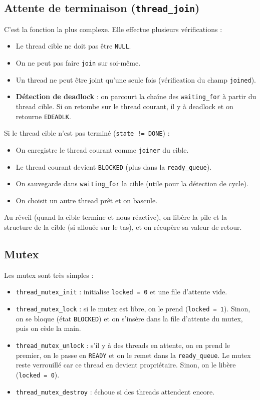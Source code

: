 \documentclass[12pt,a4paper]{article}
\begin{document}
\subsection{Attente de terminaison (\texttt{thread\_join})}

C’est la fonction la plus complexe. Elle effectue plusieurs vérifications :

\begin{itemize}
    \item Le thread cible ne doit pas être \texttt{NULL}.
    \item On ne peut pas faire \texttt{join} sur soi-même.
    \item Un thread ne peut être joint qu’une seule fois (vérification du champ \texttt{joined}).
    \item \textbf{Détection de deadlock} : on parcourt la chaîne des \texttt{waiting\_for} à partir du thread cible. Si on retombe sur le thread courant, il y à deadlock et on retourne \texttt{EDEADLK}.
\end{itemize}

Si le thread cible n’est pas terminé (\texttt{state != DONE}) :

\begin{itemize}
    \item On enregistre le thread courant comme \texttt{joiner} du cible.
    \item Le thread courant devient \texttt{BLOCKED} (plus dans la \texttt{ready\_queue}).
    \item On sauvegarde dans \texttt{waiting\_for} la cible (utile pour la détection de cycle).
    \item On choisit un autre thread prêt et on bascule.
\end{itemize}

Au réveil (quand la cible termine et nous réactive), on libère la pile et la structure de la cible (si allouée sur le tas), et on récupère sa valeur de retour.

\subsection{Mutex}

Les mutex sont très simples :

\begin{itemize}
    \item \texttt{thread\_mutex\_init} : initialise \texttt{locked = 0} et une file d’attente vide.
    \item \texttt{thread\_mutex\_lock} : si le mutex est libre, on le prend (\texttt{locked = 1}). Sinon, on se bloque (état \texttt{BLOCKED}) et on s’insère dans la file d’attente du mutex, puis on cède la main.
    \item \texttt{thread\_mutex\_unlock} : s’il y à des threads en attente, on en prend le premier, on le passe en \texttt{READY} et on le remet dans la \texttt{ready\_queue}. Le mutex reste verrouillé car ce thread en devient propriétaire. Sinon, on le libère (\texttt{locked = 0}).
    \item \texttt{thread\_mutex\_destroy} : échoue si des threads attendent encore.
\end{itemize}
\end{document}
